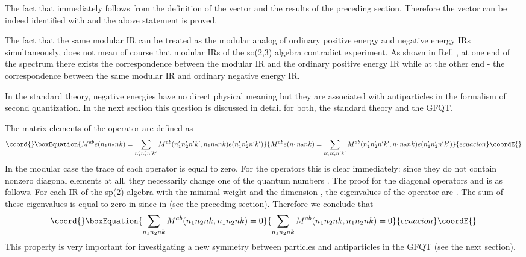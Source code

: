 \documentclass[a4paper,12pt]{article}%
\begin{document}
The fact that \coordHE{} immediately follows from the
definition of the vector \coordHE{} and the results of the preceding
section. Therefore the vector \coordHE{} can be indeed identified with
\coordHE{} and the above statement is proved.
 
The fact that the same modular IR can be treated
as the modular analog of ordinary positive energy and negative 
energy IRs simultaneously, does not mean of course that
modular IRs of the so(2,3) algebra contradict experiment.
As shown in Ref. \cite{lev2}, at one end of the spectrum there 
exists the correspondence
between the modular IR and the ordinary positive energy IR
while at the other end - the correspondence between the same 
modular IR and ordinary negative energy IR.

In the standard theory, negative energies have no direct
physical meaning but they are associated with antiparticles
in the formalism of second quantization. In the next
section this question is discussed in detail for both, the 
standard theory and the GFQT.

The matrix elements of the operator \coordHE{} are defined as
\begin{equation}\coord{}\boxEquation{
M^{ab}e(n_1n_2nk)=\sum_{n_1'n_2'n'k'}
M^{ab}(n_1'n_2'n'k',n_1n_2nk)e(n_1'n_2'n'k')
\label{28}
}{
M^{ab}e(n_1n_2nk)=\sum_{n_1'n_2'n'k'}
M^{ab}(n_1'n_2'n'k',n_1n_2nk)e(n_1'n_2'n'k')
}{ecuacion}\coordE{}\end{equation}
In the modular case the trace of each operator \coordHE{} is
equal to zero. For the operators \coordHE{}
this is clear immediately: since they do not contain
nonzero diagonal elements at all, they necessarily change
one of the quantum numbers \coordHE{}. The proof for the
diagonal operators \coordHE{} and \coordHE{} is as follows. For each 
IR of the sp(2) algebra with the minimal weight \coordHE{} and the 
dimension \coordHE{}, the eigenvalues of the operator \coordHE{} are 
\coordHE{}. The sum of these eigenvalues is
equal to zero in \coordHE{} since \coordHE{} in \coordHE{} (see the
preceding section). Therefore we conclude that
\begin{equation}\coord{}\boxEquation{
\sum_{n_1n_2nk} M^{ab}(n_1n_2nk,n_1n_2nk)=0
\label{29}
}{
\sum_{n_1n_2nk} M^{ab}(n_1n_2nk,n_1n_2nk)=0
}{ecuacion}\coordE{}\end{equation} 
This property is very important for investigating a new
symmetry between particles and antiparticles in the GFQT
(see the next section).
\end{document}
